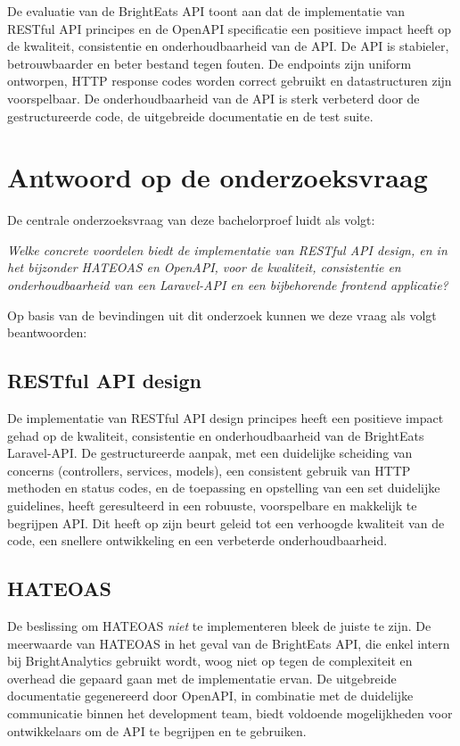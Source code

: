 \bigskip

De evaluatie van de BrightEats API toont aan dat de implementatie van RESTful API principes en de OpenAPI specificatie een positieve impact heeft op de kwaliteit, consistentie en onderhoudbaarheid van de API. De API is stabieler, betrouwbaarder en beter bestand tegen fouten. De endpoints zijn uniform ontworpen, HTTP response codes worden correct gebruikt en datastructuren zijn voorspelbaar. De onderhoudbaarheid van de API is sterk verbeterd door de gestructureerde code, de uitgebreide documentatie en de test suite.

\section{Antwoord op de onderzoeksvraag}

De centrale onderzoeksvraag van deze bachelorproef luidt als volgt:

\begin{displayquote}
  \textit{Welke concrete voordelen biedt de implementatie van RESTful API design, en in het bijzonder HATEOAS en OpenAPI, voor de kwaliteit, consistentie en onderhoudbaarheid van een Laravel-API en een bijbehorende frontend applicatie?}
\end{displayquote}

Op basis van de bevindingen uit dit onderzoek kunnen we deze vraag als volgt beantwoorden:

\subsection{RESTful API design}

De implementatie van RESTful API design principes heeft een positieve impact gehad op de kwaliteit, consistentie en onderhoudbaarheid van de BrightEats Laravel-API. De gestructureerde aanpak, met een duidelijke scheiding van concerns (controllers, services, models), een consistent gebruik van HTTP methoden en status codes, en de toepassing en opstelling van een set duidelijke guidelines, heeft geresulteerd in een robuuste, voorspelbare en makkelijk te begrijpen API. Dit heeft op zijn beurt geleid tot een verhoogde kwaliteit van de code, een snellere ontwikkeling en een verbeterde onderhoudbaarheid.

\subsection{HATEOAS}

De beslissing om HATEOAS \textit{niet} te implementeren bleek de juiste te zijn. De meerwaarde van HATEOAS in het geval van de BrightEats API, die enkel intern bij BrightAnalytics gebruikt wordt, woog niet op tegen de complexiteit en overhead die gepaard gaan met de implementatie ervan. De uitgebreide documentatie gegenereerd door OpenAPI, in combinatie met de duidelijke communicatie binnen het development team, biedt voldoende mogelijkheden voor ontwikkelaars om de API te begrijpen en te gebruiken.

